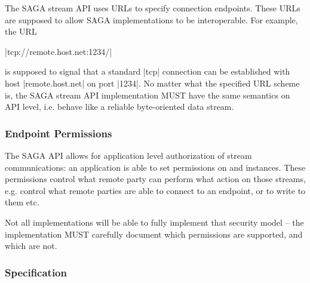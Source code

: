     The SAGA stream API uses URLs to specify connection
    endpoints.  These URLs are supposed to allow SAGA
    implementations to be interoperable.  For example, the URL
 
    \shift |tcp://remote.host.net:1234/|
 
    is supposed to signal that a standard |tcp| connection can
    be established with host |remote.host.net| on port |1234|.
    No matter what the specified URL scheme is, the SAGA stream
    API implementation MUST have the same semantics on API
    level, i.e. behave like a reliable byte-oriented data
    stream.
 
   \subsubsection{Endpoint Permissions}
 
    The SAGA API allows for application level authorization of
    stream communications: an application is able to set
    permissions on  and 
    instances.  These permissions control what remote party can
    perform what action on those streams, e.g.  control what
    remote parties are able to connect to an endpoint, or to
    write to them etc.
 
    Not all implementations will be able to fully implement that
    security model -- the implementation MUST carefully document
    which permissions are supported, and which are not.
 
 \subsubsection{Specification}
 
